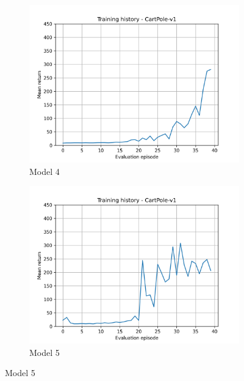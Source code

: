 \documentclass[a4paper,10pt]{article}
\begin{document}
\begin{figure}[htbp]
  \begin{subfigure}{0.3\textwidth}
    \includegraphics[width=\textwidth]{figures/CartPole_history_4.png}
    \caption{Model 4}
    \label{fig:image4}
  \end{subfigure}
  \label{fig:both_images}
   \hfill
  \begin{subfigure}{0.3\textwidth}
    \includegraphics[width=\textwidth]{figures/CartPole_history_5.png}
    \caption{Model 5}
    \label{fig:image5}
  \end{subfigure}
  \label{fig:both_images}
\end{figure}
\end{document}

